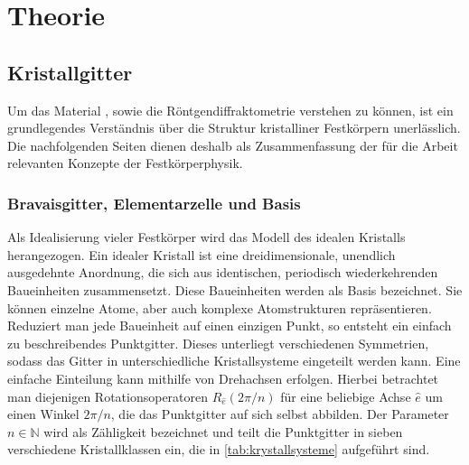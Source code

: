 \section{Theorie}\label{sec:theorie}

\subsection{Kristallgitter}\label{subsec:kristallgitter}
Um das Material \heo, sowie die Röntgendiffraktometrie verstehen zu können, ist ein grundlegendes Verständnis
über die Struktur kristalliner Festkörpern unerlässlich.
Die nachfolgenden Seiten dienen deshalb als Zusammenfassung der für die Arbeit relevanten Konzepte der Festkörperphysik.

\subsubsection{Bravaisgitter, Elementarzelle und Basis}
Als Idealisierung vieler Festkörper wird das Modell des idealen Kristalls herangezogen.
Ein idealer Kristall ist eine dreidimensionale, unendlich ausgedehnte Anordnung, die sich aus identischen, periodisch
wiederkehrenden Baueinheiten zusammensetzt.
Diese Baueinheiten werden als Basis bezeichnet.
Sie können einzelne Atome, aber auch komplexe Atomstrukturen repräsentieren.
Reduziert man jede Baueinheit auf einen einzigen Punkt, so entsteht ein einfach zu beschreibendes Punktgitter.
\autocite[49]{Hunklinger}
Dieses unterliegt verschiedenen Symmetrien, sodass das Gitter in unterschiedliche Kristallsysteme eingeteilt werden
kann.
Eine einfache Einteilung kann mithilfe von Drehachsen erfolgen.
Hierbei betrachtet man diejenigen Rotationsoperatoren $R_{\hat{e}}(2\pi / n)$ für eine beliebige Achse $\hat{e}$ um
einen Winkel $2 \pi /n$, die das Punktgitter auf sich selbst abbilden.
Der Parameter $n \in \mathbb{N}$ wird als Zähligkeit bezeichnet und teilt die Punktgitter in sieben verschiedene
Kristallklassen ein, die in \cref{tab:krystallsysteme} aufgeführt sind.
\autocite[53]{Hunklinger}
